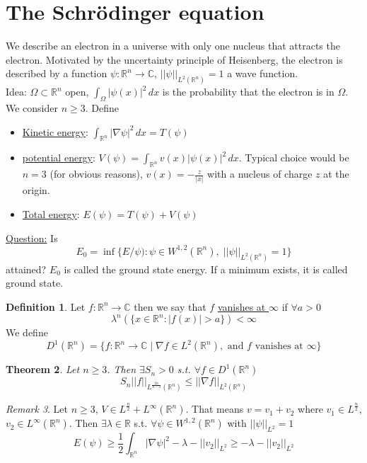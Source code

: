 \documentclass[a4paper, 12pt]{article}
\theoremstyle{plain}
\newtheorem{theorem}{Theorem}[section] %
\theoremstyle{definition}
\newtheorem{definition}[theorem]{Definition} %
\theoremstyle{lemma}
\theoremstyle{remark}
\newtheorem{remark}[theorem]{Remark}
\theoremstyle{corollary}
\theoremstyle{example}
\begin{document}
	\section{The Schrödinger equation}
	We describe an electron in a universe with only one nucleus that attracts the electron. Motivated by the uncertainty principle of Heisenberg, the electron is described by a function $\psi: \mathbb{R}^n \to \mathbb{C}$, $||\psi||_{L^2(\mathbb{R}^n)}=1$ a wave function.\\
	Idea: $\Omega \subset \mathbb{R}^n$ open, $\int_\Omega \left|\psi(x)\right|^2 \, dx$ is the probability that the electron is in $\Omega$.\\
	We consider $n \geq 3$. Define \begin{itemize}
		\item \underline{Kinetic energy}: $\int_{\mathbb{R}^n} \left|\nabla \psi\right|^2 \, dx = T(\psi)$
		\item \underline{potential energy}: $V(\psi) = \int_{\mathbb{R}^n} v(x) \left|\psi(x)\right|^2 \, dx$. Typical choice would be $n=3$ (for obvious reasons), $v(x) = -\frac{z}{\left|x\right|}$ with a nucleus of charge $z$ at the origin.
		\item \underline{Total energy}: $E(\psi) = T(\psi) + V(\psi)$
	\end{itemize}
	\underline{Question:} Is \[E_0 = \inf\{E/\psi): \psi \in W^{1,2}(\mathbb{R}^n), \; ||\psi||_{L^2(\mathbb{R}^n)} = 1\}\] attained? $E_0$ is called the ground state energy. If a minimum exists, it is called ground state.
	\begin{definition}
		Let $f:\mathbb{R}^n \to \mathbb{C}$ then we say that $f$ \underline{vanishes at $\infty$} if $\forall a > 0$ \[\lambda^n(\{x \in \mathbb{R}^n: \left|f(x)\right| > a\}) < \infty\]
		We define \[D^1(\mathbb{R}^n) = \{f: \mathbb{R}^n \to \mathbb{C} \mid \nabla f \in L^2(\mathbb{R}^n), \text{ and $f$ vanishes at } \infty\}\]
	\end{definition}
	\begin{theorem}
		Let $n\geq 3$. Then $\exists S_n > 0$ s.t. $\forall f\in D^1(\mathbb{R}^n)$ \[S_n||f||_{L^\frac{2n}{n-2}(\mathbb{R}^n)} \leq ||\nabla f||_{L^2(\mathbb{R}^n)}\]
	\end{theorem}
	\begin{remark}
		\label{rem: potential}
		Let $n \geq 3$, $V \in L^{\frac{n}{2}} + L^\infty(\mathbb{R}^n)$. That means $v=v_1+v_2$ where $v_1 \in L^{\frac{n}{2}}$, $v_2 \in L^\infty(\mathbb{R}^n)$. Then $\exists \lambda \in \mathbb{R}$ s.t. $\forall \psi \in W^{1,2}(\mathbb{R}^n)$ with $||\psi||_{L^2} = 1$ \[E(\psi) \geq \frac{1}{2} \int_{\mathbb{R}^n} \left|\nabla \psi\right|^2 - \lambda - ||v_2||_{L^2} \geq -\lambda - ||v_2||_{L^2}\]
	\end{remark}
\end{document}
